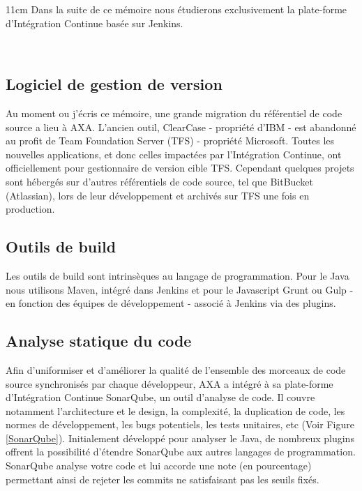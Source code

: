     \begin {boxedminipage} {11cm}
      Dans la suite de ce mémoire nous étudierons exclusivement la plate-forme d'Intégration Continue basée sur Jenkins.
    \end {boxedminipage}\\

    \subsection{Logiciel de gestion de version}
    Au moment ou j'écris ce mémoire, une grande migration du référentiel de code source a lieu à AXA. L'ancien outil, ClearCase - propriété d'IBM - est abandonné au profit de Team Foundation Server (\gls{TFS}) - propriété Microsoft. Toutes les nouvelles applications, et donc celles impactées par l'Intégration Continue, ont officiellement pour gestionnaire de version cible TFS. Cependant quelques projets sont hébergés sur d'autres référentiels de code source, tel que BitBucket (Atlassian), lors de leur développement et archivés sur TFS une fois en production.

    \subsection{Outils de build}
    Les outils de build sont intrinsèques au langage de programmation. Pour le Java nous utilisons Maven, intégré dans Jenkins et pour le Javascript Grunt ou Gulp - en fonction des équipes de développement - associé à Jenkins via des plugins.

    \subsection{Analyse statique du code}
    Afin d'uniformiser et d'améliorer la qualité de l'ensemble des morceaux de code source synchronisés par chaque développeur, AXA a intégré à sa plate-forme d'Intégration Continue SonarQube, un outil d'analyse de code. Il couvre notamment l'architecture et le design, la complexité, la duplication de code, les normes de développement, les bugs potentiels, les tests unitaires, etc (Voir Figure \ref{SonarQube}). Initialement développé pour analyser le Java, de nombreux plugins offrent la possibilité d'étendre SonarQube aux autres langages de programmation. SonarQube analyse votre code et lui accorde une note (en pourcentage) permettant ainsi de rejeter les commits ne satisfaisant pas les seuils fixés.\\


